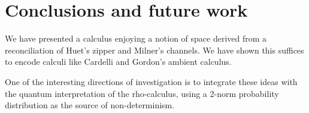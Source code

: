 \section{Conclusions and future work}

We have presented a calculus enjoying a notion of space derived from a
reconciliation of Huet's zipper and Milner's channels. We have shown
this suffices to encode calculi like Cardelli and Gordon's ambient
calculus.

One of the interesting directions of investigation is to integrate
these ideas with the quantum interpretation of the rho-calculus, using
a 2-norm probability distribution as the source of non-determinism.





